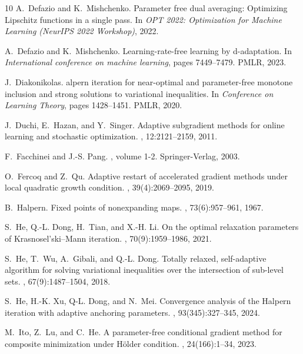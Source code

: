 \documentclass{article}
\theoremstyle{plain}
\theoremstyle{definition}
\newcommand{\0}{\boldsymbol{0}}
\begin{document}
\begin{thebibliography}{10}
A.~Defazio and K.~Mishchenko.
\newblock Parameter free dual averaging: {O}ptimizing {L}ipschitz functions in
  a single pass.
\newblock In {\em OPT 2022: Optimization for Machine Learning (NeurIPS 2022
  Workshop)}, 2022.

A.~Defazio and K.~Mishchenko.
\newblock Learning-rate-free learning by d-adaptation.
\newblock In {\em International conference on machine learning}, pages
  7449--7479. PMLR, 2023.

J.~Diakonikolas.
alpern iteration for near-optimal and parameter-free monotone
  inclusion and strong solutions to variational inequalities.
\newblock In {\em Conference on Learning Theory}, pages 1428--1451. PMLR, 2020.

J.~Duchi, E.~Hazan, and Y.~Singer.
\newblock Adaptive subgradient methods for online learning and stochastic
  optimization.
, 12:2121--2159, 2011.

F.~Facchinei and J.-S. Pang.
, volume 1-2.
\newblock Springer-Verlag, 2003.

O.~Fercoq and Z.~Qu.
\newblock Adaptive restart of accelerated gradient methods under local
  quadratic growth condition.
, 39(4):2069--2095, 2019.

B.~Halpern.
\newblock Fixed points of nonexpanding maps.
, 73(6):957--961, 1967.

S.~He, Q.-L. Dong, H.~Tian, and X.-H. Li.
\newblock On the optimal relaxation parameters of {K}rasnosel'ski--{M}ann
  iteration.
, 70(9):1959--1986, 2021.

S.~He, T.~Wu, A.~Gibali, and Q.-L. Dong.
\newblock Totally relaxed, self-adaptive algorithm for solving variational
  inequalities over the intersection of sub-level sets.
, 67(9):1487--1504, 2018.

S.~He, H.-K. Xu, Q-L. Dong, and N.~Mei.
\newblock Convergence analysis of the {H}alpern iteration with adaptive
  anchoring parameters.
, 93(345):327--345, 2024.

M.~Ito, Z.~Lu, and C.~He.
\newblock A parameter-free conditional gradient method for composite
  minimization under {H}{\"o}lder condition.
, 24(166):1--34, 2023.


\end{thebibliography}
\end{document}
